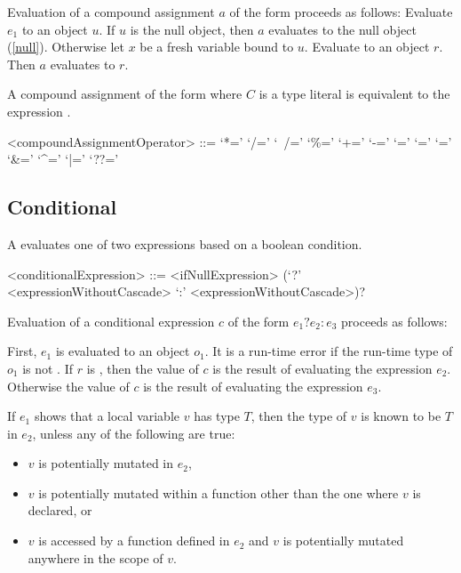 \documentclass[makeidx]{article}
\begin{document}
\LMHash{}%
Evaluation of a compound assignment $a$ of the form 
proceeds as follows:
Evaluate $e_1$ to an object $u$.
If $u$ is the null object, then $a$ evaluates to the null object (\ref{null}).
Otherwise let $x$ be a fresh variable bound to $u$.
Evaluate  to an object $r$.
Then $a$ evaluates to $r$.

\LMHash{}%
A compound assignment of the form 
where $C$ is a type literal
is equivalent to the expression .

\begin{grammar}
<compoundAssignmentOperator> ::= `*='
  \alt `/='
  \alt `~/='
  \alt `\%='
  \alt `+='
  \alt `-='
  \alt `\ltlt='
  \alt `\gtgt='
  \alt `\gtgtgt='
  \alt `\&='
  \alt `^='
  \alt `|='
  \alt `??='
\end{grammar}


\subsection{Conditional}

\LMHash{}%
A  evaluates one of two expressions based on a boolean condition.

\begin{grammar}
<conditionalExpression> ::= <ifNullExpression>
  \gnewline{} (`?' <expressionWithoutCascade> `:' <expressionWithoutCascade>)?
\end{grammar}

\LMHash{}%
Evaluation of a conditional expression $c$ of the form $e_1 ? e_2 : e_3$ proceeds as follows:

\LMHash{}%
First, $e_1$ is evaluated to an object $o_1$.
It is a run-time error if the run-time type of $o_1$ is not .
If $r$ is \TRUE, then the value of $c$ is the result of evaluating the expression $e_2$.
Otherwise the value of $c$ is the result of evaluating the expression $e_3$.

\LMHash{}%
If $e_1$ shows that a local variable $v$ has type $T$,
then the type of $v$ is known to be $T$ in $e_2$,
unless any of the following are true:
\begin{itemize}
\item $v$ is potentially mutated in $e_2$,
\item $v$ is potentially mutated within a function other
than the one where $v$ is declared, or
\item $v$ is accessed by a function defined in $e_2$ and
$v$ is potentially mutated anywhere in the scope of $v$.
\end{itemize}
\end{document}

